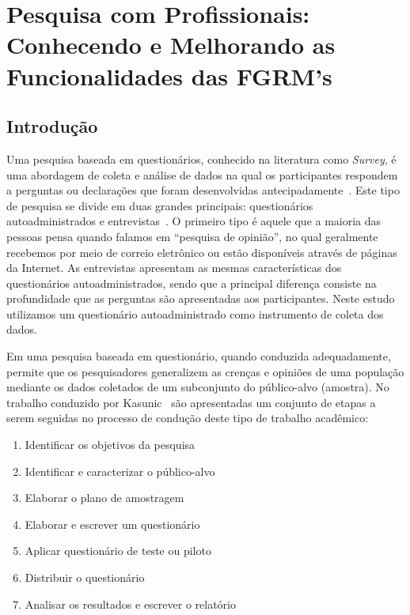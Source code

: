 \chapter{Pesquisa com Profissionais: Conhecendo e Melhorando as Funcionalidades
das FGRM's}
\label{ch:pesquisa-profissionais}

\section{Introdução}
\label{sec:pesquisa-profissionais-intro}

Uma pesquisa baseada em questionários, conhecido na literatura como
\textit{Survey}, é uma abordagem de coleta e análise de dados na qual os
participantes respondem a perguntas ou declarações que foram desenvolvidas
antecipadamente~\cite{kasunic2005designing}. Este tipo de pesquisa se divide em
duas grandes principais: questionários autoadministrados e
entrevistas~\cite{kasunic2005designing}. O primeiro tipo é aquele que  a maioria
das pessoas pensa quando falamos em  ``pesquisa de opinião'', no qual geralmente
recebemos por meio de correio eletrônico ou estão disponíveis através de páginas
da Internet. As entrevistas apresentam as mesmas características dos
questionários autoadministrados, sendo que a principal diferença consiste na
profundidade que as perguntas são apresentadas aos participantes.  Neste estudo
utilizamos um questionário autoadministrado como instrumento de coleta dos
dados.

Em uma pesquisa baseada em questionário, quando conduzida adequadamente, permite
que os pesquisadores generalizem as crenças e opiniões de uma população mediante
os dados coletados de um subconjunto do público-alvo (amostra). No trabalho
conduzido por Kasunic~\cite{kasunic2005designing} são apresentadas um conjunto
de etapas a serem seguidas no processo de condução deste tipo de trabalho
acadêmico:

\begin{enumerate}
\item{Identificar os objetivos da pesquisa}
\item{Identificar e caracterizar o público-alvo}
\item{Elaborar o plano de amostragem}
\item{Elaborar e escrever um questionário}
\item{Aplicar questionário de teste ou piloto}
\item{Distribuir o questionário}
\item{Analisar os resultados e escrever o relatório}
\end{enumerate}

